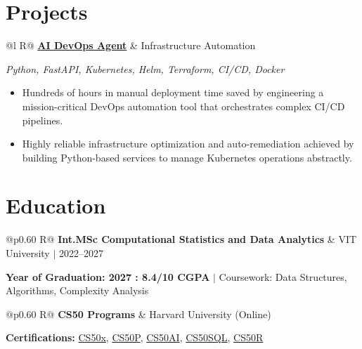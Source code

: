 \documentclass[a4paper,10pt]{article}
\newcommand{\ulink}[2]{\href{#1}{#2}}
\newcommand{\subheading}[1]{{\color[HTML]{0A0A0A}\fontsize{12}{14}\selectfont\bfseries #1}}
\newcommand{\techstack}[1]{{\color[HTML]{5C5C5C}\fontsize{10.5}{12.5}\selectfont\itshape #1}}
\newcommand{\meta}[1]{{\color[HTML]{5C5C5C}\fontsize{10.5}{12.5}\selectfont #1}}
\begin{document}
\section{Projects}
\vspace{2pt}

\begin{tabularx}{\linewidth}{@{}l R@{}}
\subheading{\ulink{https://github.com/su-jin1425/AI-DevOps-Agent}{AI DevOps Agent}} & \meta{Infrastructure Automation}
\end{tabularx}
\techstack{Python, FastAPI, Kubernetes, Helm, Terraform, CI/CD, Docker}
\begin{itemize}[nosep, leftmargin=1.5em, itemsep=2pt, topsep=2pt]
  \item {\color[HTML]{0A0A0A}\fontsize{11}{14}\selectfont Hundreds of hours in manual deployment time saved by engineering a mission-critical DevOps automation tool that orchestrates complex CI/CD pipelines.}
  \item {\color[HTML]{0A0A0A}\fontsize{11}{14}\selectfont Highly reliable infrastructure optimization and auto-remediation achieved by building Python-based services to manage Kubernetes operations abstractly.}
\end{itemize}

\section{Education}
\vspace{2pt}

\begin{tabularx}{\linewidth}{@{}p{0.60\linewidth} R@{}}
\subheading{Int.MSc Computational Statistics and Data Analytics} & \meta{VIT University $|$ 2022--2027}
\end{tabularx}
{\color[HTML]{3A3A3A}\fontsize{11}{14}\selectfont \textbf{Year of Graduation: 2027 : 8.4/10 CGPA} $|$ Coursework: Data Structures, Algorithms, Complexity Analysis}

\begin{tabularx}{\linewidth}{@{}p{0.60\linewidth} R@{}}
\subheading{CS50 Programs} & \meta{Harvard University (Online)}
\end{tabularx}
{\color[HTML]{3A3A3A}\fontsize{11}{14}\selectfont \textbf{Certifications:} \ulink{https://cs50.harvard.edu/certificates/b14b78df-e05c-413e-a607-1dd27303053a}{CS50x}, \ulink{https://cs50.harvard.edu/certificates/32477052-9db4-49c4-a5a4-d7e58429ca2c}{CS50P}, \ulink{https://cs50.harvard.edu/certificates/9cdb4d4a-1250-4f8e-9fd7-191864e0f919}{CS50AI}, \ulink{https://cs50.harvard.edu/certificates/bc486f24-f085-4e61-8536-80940b97a1b9}{CS50SQL}, \ulink{https://cs50.harvard.edu/certificates/666838e6-a053-4d82-b179-a60fe745fd84}{CS50R}}
\end{document}
